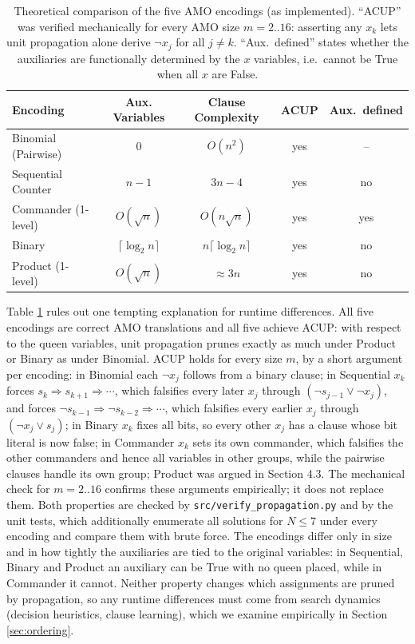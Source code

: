 \documentclass[a4paper,fleqn]{cas-sc}
\begin{document}
\begin{table}[htbp]
    \centering
    \renewcommand{\arraystretch}{1.15}
    \caption{Theoretical comparison of the five AMO encodings (as implemented). ``ACUP'' was verified mechanically for every AMO size $m = 2..16$: asserting any $x_k$ lets unit propagation alone derive $\neg x_j$ for all $j \neq k$. ``Aux.\ defined'' states whether the auxiliaries are functionally determined by the $x$ variables, i.e.\ cannot be True when all $x$ are False.}
    \label{tab:theory}
    \begin{tabular}{l c c c c}
        \toprule
        \rowcolor{rowtint}
        \textbf{Encoding} & \textbf{Aux. Variables} & \textbf{Clause Complexity} & \textbf{ACUP} & \textbf{Aux.\ defined} \\
        \midrule
        Binomial (Pairwise) & $0$                 & $O(n^2)$          & yes & -- \\
        Sequential Counter  & $n-1$               & $3n-4$            & yes & no \\
        Commander (1-level) & $O(\sqrt{n})$       & $O(n\sqrt{n})$    & yes & yes \\
        Binary              & $\lceil\log_2 n\rceil$ & $n\lceil\log_2 n\rceil$ & yes & no \\
        Product (1-level)   & $O(\sqrt{n})$       & $\approx 3n$      & yes & no \\
        \bottomrule
    \end{tabular}
\end{table}

Table \ref{tab:theory} rules out one tempting explanation for runtime differences. All five encodings are correct AMO translations and all five achieve ACUP: with respect to the queen variables, unit propagation prunes exactly as much under Product or Binary as under Binomial. ACUP holds for every size $m$, by a short argument per encoding: in Binomial each $\neg x_j$ follows from a binary clause; in Sequential $x_k$ forces $s_k \Rightarrow s_{k+1} \Rightarrow \cdots$, which falsifies every later $x_j$ through $(\neg s_{j-1} \vee \neg x_j)$, and forces $\neg s_{k-1} \Rightarrow \neg s_{k-2} \Rightarrow \cdots$, which falsifies every earlier $x_j$ through $(\neg x_j \vee s_j)$; in Binary $x_k$ fixes all bits, so every other $x_j$ has a clause whose bit literal is now false; in Commander $x_k$ sets its own commander, which falsifies the other commanders and hence all variables in other groups, while the pairwise clauses handle its own group; Product was argued in Section 4.3. The mechanical check for $m = 2..16$ confirms these arguments empirically; it does not replace them. Both properties are checked by \texttt{src/verify\_propagation.py} and by the unit tests, which additionally enumerate all solutions for $N \leq 7$ under every encoding and compare them with brute force. The encodings differ only in size and in how tightly the auxiliaries are tied to the original variables: in Sequential, Binary and Product an auxiliary can be True with no queen placed, while in Commander it cannot. Neither property changes which assignments are pruned by propagation, so any runtime differences must come from search dynamics (decision heuristics, clause learning), which we examine empirically in Section \ref{sec:ordering}.
\end{document}
